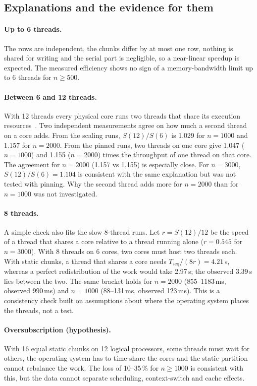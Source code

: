 \documentclass[11pt,a4paper]{article}
\begin{document}
\subsection{Explanations and the evidence for them}

\paragraph{Up to 6 threads.} The rows are independent, the chunks differ by at most one row, nothing is shared for writing and the serial part is negligible, so a near-linear speedup is expected. The measured efficiency shows no sign of a memory-bandwidth limit up to 6 threads for $n \ge 500$.

\paragraph{Between 6 and 12 threads.} With 12 threads every physical core runs two threads that share its execution resources~\cite{marr}. Two independent measurements agree on how much a second thread on a core adds. From the scaling runs, $S(12)/S(6)$ is 1.029 for $n = 1000$ and 1.157 for $n = 2000$. From the pinned runs, two threads on one core give 1.047 ($n = 1000$) and 1.155 ($n = 2000$) times the throughput of one thread on that core. The agreement for $n = 2000$ (1.157 vs 1.155) is especially close. For $n = 3000$, $S(12)/S(6) = 1.104$ is consistent with the same explanation but was not tested with pinning. Why the second thread adds more for $n = 2000$ than for $n = 1000$ was not investigated.

\paragraph{8 threads.} A simple check also fits the slow 8-thread runs. Let $r = S(12)/12$ be the speed of a thread that shares a core relative to a thread running alone ($r = 0.545$ for $n = 3000$). With 8 threads on 6 cores, two cores must host two threads each. With static chunks, a thread that shares a core needs $T_{\mathrm{seq}}/(8r) = 4.21$\,s, whereas a perfect redistribution of the work would take 2.97\,s; the observed 3.39\,s lies between the two. The same bracket holds for $n = 2000$ (855--1183\,ms, observed 990\,ms) and $n = 1000$ (88--131\,ms, observed 123\,ms). This is a consistency check built on assumptions about where the operating system places the threads, not a test.

\paragraph{Oversubscription (hypothesis).} With 16 equal static chunks on 12 logical processors, some threads must wait for others, the operating system has to time-share the cores and the static partition cannot rebalance the work. The loss of 10--35\,\% for $n \ge 1000$ is consistent with this, but the data cannot separate scheduling, context-switch and cache effects.
\end{document}
